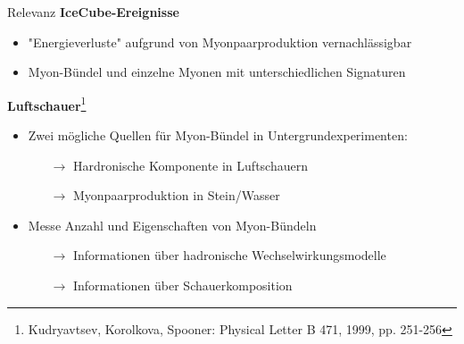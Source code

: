 \documentclass[aspectratio=1610, captions=tableheading, 11pt]{beamer}
\begin{document}
\begin{frame}{Relevanz}
  \textbf{IceCube-Ereignisse}
   \begin{itemize}
    \item "Energieverluste" aufgrund von Myonpaarproduktion vernachlässigbar
    \item Myon-Bündel und einzelne Myonen mit unterschiedlichen Signaturen
   \end{itemize}
     \vspace{3mm}
     \textbf{Luftschauer}\footnote{Kudryavtsev, Korolkova, Spooner: Physical Letter B 471, 1999, pp. 251-256}
   \begin{itemize}
    \item Zwei mögliche Quellen für Myon-Bündel in Untergrundexperimenten:
    \begin{itemize}
      \item[$\rightarrow$] Hardronische Komponente in Luftschauern
      \item[$\rightarrow$] Myonpaarproduktion in Stein/Wasser
    \end{itemize}
    \item Messe Anzahl und Eigenschaften von Myon-Bündeln
    \begin{itemize}
      \item[$\rightarrow$] Informationen über hadronische Wechselwirkungsmodelle
      \item[$\rightarrow$] Informationen über Schauerkomposition
    \end{itemize}
   \end{itemize}
\end{frame}
\end{document}
